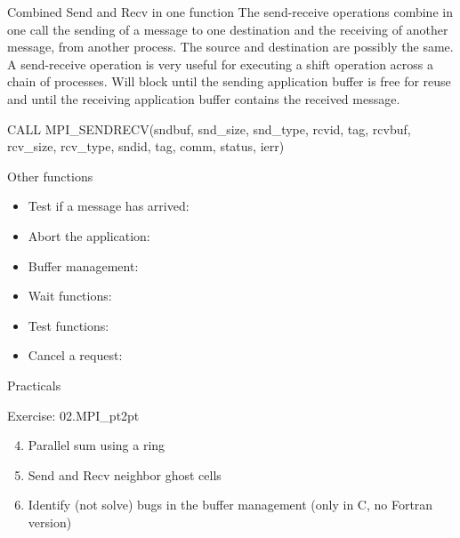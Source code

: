 \documentclass[aspectratio=43]{beamer}
\begin{document}
\begin{frame}[fragile]{Combined Send and Recv in one function}
\justifying
The send-receive operations combine in one call the sending of a message to one destination and the receiving of another message, from another process.
The source and destination are possibly the same.
A send-receive operation is very useful for executing a shift operation across a chain of processes.
Will block until the sending application buffer is free for reuse and until the receiving application buffer contains the received message.
\begin{Fortranlisting}[]{}
CALL MPI_SENDRECV(sndbuf, snd_size, snd_type, rcvid, tag,
                  rcvbuf, rcv_size, rcv_type, sndid, tag,
                  comm, status, ierr)
\end{Fortranlisting}
\end{frame}

\begin{frame}[fragile]{Other functions}
\begin{itemize}
\item Test if a message has arrived:\\\hspace{1cm}
\item Abort the application:\\\hspace{1cm}
\item Buffer management:\\\hspace{1cm}
\item Wait functions:\\\hspace{1cm}
\item Test functions:\\\hspace{1cm}
\item Cancel a request:\\\hspace{1cm}
\end{itemize}
\end{frame}

\begin{frame}[fragile]{Practicals}
    \begin{brown2block}{Exercise: 02.MPI\_pt2pt}
    \begin{enumerate}
        \setcounter{enumi}{3}
        \item Parallel sum using a ring
        \item Send and Recv neighbor ghost cells
        \item Identify (not solve) bugs in the buffer management (only in C, no Fortran version)
    \end{enumerate}
    \end{brown2block}
\end{frame}
\end{document}
